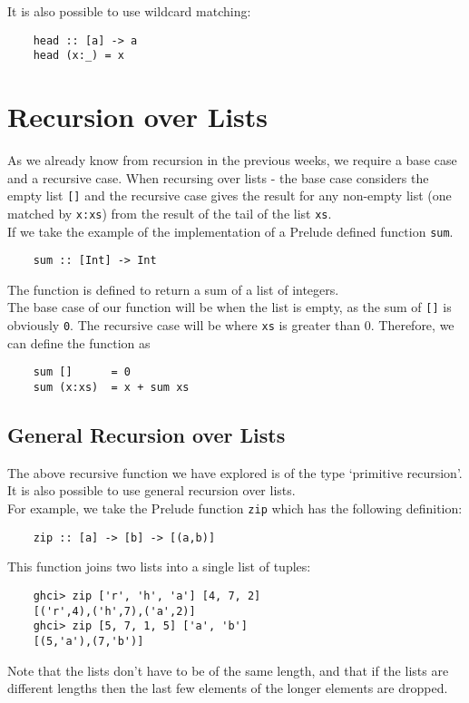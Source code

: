 It is also possible to use wildcard matching:
\begin{verbatim}
    head :: [a] -> a
    head (x:_) = x
\end{verbatim}


\section{Recursion over Lists}
As we already know from recursion in the previous weeks, we require a base case and a recursive case. When recursing over lists - the base case considers the empty list \verb|[]| and the recursive case gives the result for any non-empty list (one matched by \verb|x:xs|) from the result of the tail of the list \verb|xs|. \\

If we take the example of the implementation of a Prelude defined function \verb|sum|.
\begin{verbatim}
    sum :: [Int] -> Int
\end{verbatim}
The function is defined to return a sum of a list of integers.\\

The base case of our function will be when the list is empty, as the sum of \verb|[]| is obviously \verb|0|. The recursive case will be where \verb|xs| is greater than 0. Therefore, we can define the function as
\begin{verbatim}
    sum []      = 0
    sum (x:xs)  = x + sum xs
\end{verbatim}

\subsection{General Recursion over Lists}
The above recursive function we have explored is of the type `primitive recursion'. It is also possible to use general recursion over lists.\\

For example, we take the Prelude function \verb|zip| which has the following definition:
\begin{verbatim}
    zip :: [a] -> [b] -> [(a,b)]
\end{verbatim}
This function joins two lists into a single list of tuples:
\begin{verbatim}
    ghci> zip ['r', 'h', 'a'] [4, 7, 2]
    [('r',4),('h',7),('a',2)]
    ghci> zip [5, 7, 1, 5] ['a', 'b']
    [(5,'a'),(7,'b')]
\end{verbatim}
Note that the lists don't have to be of the same length, and that if the lists are different lengths then the last few elements of the longer elements are dropped.\\

